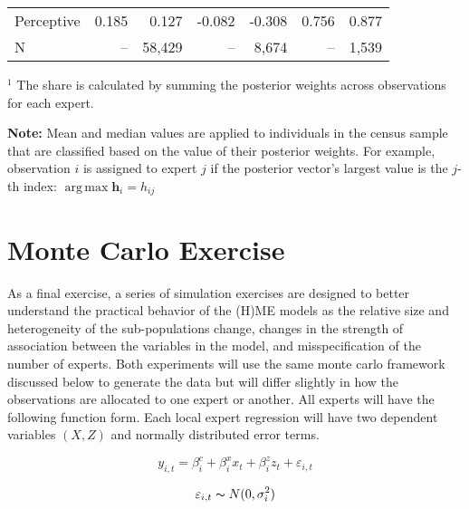 \documentclass[12pt]{article}
\DeclareMathOperator*{\argmax}{arg\,max}
\theoremstyle{definition}
\begin{document}
\begin{table}
\begin{threeparttable}
\begin{tabular}[l]{l r r r r r r}
      Perceptive            &   0.185 &   0.127 & -0.082 & -0.308 &   0.756 &   0.877 \\
      \cmidrule{1-7}
      N                     &      -- &  58,429 &     -- &  8,674 &      -- &   1,539 \\
      \hline
        \end{tabular}
        \begin{tablenotes}
          \item{\footnotesize $^{1}$ The share is calculated by summing the 
          posterior weights across observations for each expert.}
          \item{\footnotesize \textbf{Note:} Mean and median values are applied to individuals
          in the census sample that are classified based on the value of their posterior weights.
          For example, observation $i$ is assigned to expert $j$ if the posterior vector's
          largest value is the $j$-th index: $\argmax \boldsymbol{h}_{i} = h_{ij}$}
        \end{tablenotes} \label{tbl:HME3_sample_comparison}
      \end{threeparttable}
    \end{table}
  

\clearpage


\section{Monte Carlo Exercise} \label{sec:MonteCarlo}

As a final exercise, a series of simulation exercises are designed to better understand the practical behavior of the (H)ME models as the relative size and heterogeneity of the sub-populations change, changes in the strength of association between the variables in the model, and misspecification of the number of experts. Both experiments will use the same monte carlo framework discussed below to generate the data but will differ slightly in how the observations are allocated to one expert or another. All experts will have the following function form. Each local expert regression will have two dependent variables $(X, Z)$ and normally distributed error terms. 

\begin{equation} \label{eq:MC_regression_eq}
    y_{i,t} = \beta_{i}^{c} + \beta_{i}^{x}  x_{t} + \beta_{i}^{z}  z_{t} + \varepsilon_{i,t}
\end{equation}

\begin{equation} \label{eq:MC_regression_errors}
    \varepsilon_{i,t} \thicksim N(0, \sigma^{2}_{i})
\end{equation}
\end{document}
